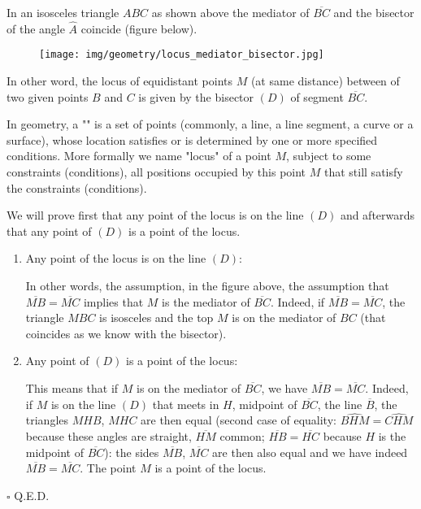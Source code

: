 	\pagebreak
	\begin{theorem}
	In an isosceles triangle $ABC$ as shown above the mediator of $\overline{BC}$ and the bisector of the angle $\hat{A}$ coincide (figure below).
	\begin{figure}[H]
		\centering
		\texttt{[image: img/geometry/locus\_mediator\_bisector.jpg]}
	\end{figure}

	In other word, the locus of equidistant points $M$ (at same distance) between of two given points $B$ and $C$ is given by the bisector $(D)$ of segment $\overline{BC}$.
	\begin{tcolorbox}[title=Remark,colframe=black,arc=10pt]
	In geometry, a "" is a set of points (commonly, a line, a line segment, a curve or a surface), whose location satisfies or is determined by one or more specified conditions. More formally we name "locus" of a point $M$, subject to some constraints (conditions), all positions occupied by this point $M$ that still satisfy the constraints (conditions).
	\end{tcolorbox}
	\end{theorem}
	\begin{dem}
	We will prove first that any point of the locus is on the line $(D)$ and afterwards that any point of $(D)$ is a point of the locus.
	\begin{enumerate}
		\item Any point of the locus is on the line $(D)$:

		In other words, the assumption, in the figure above, the assumption that $\overline{MB} =\overline{MC}$ implies that $M$ is the mediator of $\overline{BC}$. Indeed, if $\overline{MB} =\overline{MC}$, the triangle $MBC$ is isosceles and the top $M$ is on the mediator of $BC$ (that coincides as we know with the bisector).
			
		\item Any point of $(D)$ is a point of the locus:
		
		This means that if $M$ is on the mediator of $\overline{BC}$, we have $\overline{MB} = \overline{MC}$. Indeed, if $M$ is on the line $(D)$ that meets in $H$, midpoint of $\overline{BC}$, the line $\overline{B}$, the triangles $MHB$, $MHC$ are then equal (second case of equality: $\widehat{BHM}=\widehat{CHM}$ because these angles are straight, $\overline{HM}$ common; $\overline{HB} = \overline{HC}$ because $H$ is the midpoint of $\overline{BC}$): the sides $\overline{MB}$, $\overline{MC}$ are then also equal and we have indeed $\overline{MB} = \overline{MC}$. The point $M$ is a point of the locus.

	\end{enumerate}
	\begin{flushright}
		$\square$  Q.E.D.
	\end{flushright}
	\end{dem}
